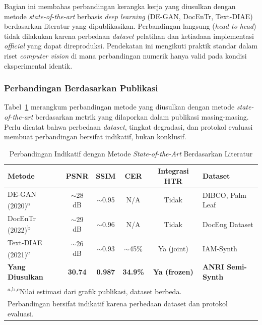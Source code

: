 \documentclass[12pt,a4paper]{article}
\begin{document}
Bagian ini membahas perbandingan kerangka kerja yang diusulkan dengan metode \textit{state-of-the-art} berbasis \textit{deep learning} (DE-GAN, DocEnTr, Text-DIAE) berdasarkan literatur yang dipublikasikan. Perbandingan langsung (\textit{head-to-head}) tidak dilakukan karena perbedaan \textit{dataset} pelatihan dan ketiadaan implementasi \textit{official} yang dapat direproduksi. Pendekatan ini mengikuti praktik standar dalam riset \textit{computer vision} di mana perbandingan numerik hanya valid pada kondisi eksperimental identik.

\subsubsection{Perbandingan Berdasarkan Publikasi}
\label{subsubsec:perbandingan-publikasi}

Tabel~\ref{table:sota-comparison-literature} merangkum perbandingan metode yang diusulkan dengan metode \textit{state-of-the-art} berdasarkan metrik yang dilaporkan dalam publikasi masing-masing. Perlu dicatat bahwa perbedaan \textit{dataset}, tingkat degradasi, dan protokol evaluasi membuat perbandingan bersifat indikatif, bukan konklusif.

\begin{table}[H]
\renewcommand{\arraystretch}{1.3}
\centering
\caption{Perbandingan Indikatif dengan Metode \textit{State-of-the-Art} Berdasarkan Literatur}
\label{table:sota-comparison-literature}
\small
\begin{tabular}{|l|c|c|c|c|l|}
\hline
\textbf{Metode} & \textbf{PSNR} & \textbf{SSIM} & \textbf{CER} & \textbf{Integrasi HTR} & \textbf{Dataset} \\
\hline
DE-GAN (2020)\textsuperscript{a} & $\sim$28 dB & $\sim$0.95 & N/A & Tidak & DIBCO, Palm Leaf \\
DocEnTr (2022)\textsuperscript{b} & $\sim$29 dB & $\sim$0.96 & N/A & Tidak & DocEng Dataset \\
Text-DIAE (2021)\textsuperscript{c} & $\sim$26 dB & $\sim$0.93 & $\sim$45\% & Ya (joint) & IAM-Synth \\
\hline
\textbf{Yang Diusulkan} & \textbf{30.74} & \textbf{0.987} & \textbf{34.9\%} & \textbf{Ya (frozen)} & \textbf{ANRI Semi-Synth} \\
\hline
\multicolumn{6}{l}{\footnotesize \textsuperscript{a,b,c}Nilai estimasi dari grafik publikasi, dataset berbeda.} \\
\multicolumn{6}{l}{\footnotesize Perbandingan bersifat indikatif karena perbedaan dataset dan protokol evaluasi.} \\
\end{tabular}
\end{table}
\end{document}
